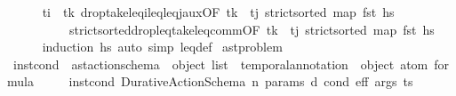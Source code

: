\begin{isabellebody}
%
\isadelimproof
\ \ \ \ %
\endisadelimproof
%
\isatagproof
{}\isamarkupfalse%
\ {\isacartoucheopen}t\isactrlsub i\ {\isasymle}\ t\isactrlsub k{\isacartoucheclose}\ drop{\isacharunderscore}{\kern0pt}take{\isacharunderscore}{\kern0pt}leq\isactrlsub i{\isacharunderscore}{\kern0pt}leq{\isacharunderscore}{\kern0pt}leq\isactrlsub j{\isacharunderscore}{\kern0pt}aux{\isacharbrackleft}{\kern0pt}OF\ {\isacartoucheopen}t\isactrlsub k\ {\isasymle}\ t\isactrlsub j{\isacartoucheclose}\ {\isacartoucheopen}strict{\isacharunderscore}{\kern0pt}sorted\ {\isacharparenleft}{\kern0pt}map\ fst\ hs{\isacharparenright}{\kern0pt}{\isacartoucheclose}{\isacharbrackright}{\kern0pt}\isanewline
\ \ \ \ \ \ \ \ \ \ strict{\isacharunderscore}{\kern0pt}sorted{\isacharunderscore}{\kern0pt}drop{\isacharunderscore}{\kern0pt}leq{\isacharunderscore}{\kern0pt}take{\isacharunderscore}{\kern0pt}leq{\isacharunderscore}{\kern0pt}comm{\isacharbrackleft}{\kern0pt}OF\ {\isacartoucheopen}t\isactrlsub k\ {\isasymle}\ t\isactrlsub j{\isacartoucheclose}\ {\isacartoucheopen}strict{\isacharunderscore}{\kern0pt}sorted\ {\isacharparenleft}{\kern0pt}map\ fst\ hs{\isacharparenright}{\kern0pt}{\isacartoucheclose}{\isacharbrackright}{\kern0pt}\isanewline
\ \ \ \ \isamarkupfalse%
\ {\isacharparenleft}{\kern0pt}induction\ hs{\isacharparenright}{\kern0pt}\ {\isacharparenleft}{\kern0pt}auto\ simp{\isacharcolon}{\kern0pt}\ leq{\isacharunderscore}{\kern0pt}def{\isacharparenright}{\kern0pt}%
\endisatagproof
{\isafoldproof}%
%
\isadelimproof
%
\endisadelimproof
%
\isadelimdocument
%
\endisadelimdocument
%
\isatagdocument
%
\isamarkuptrue%
%
\endisatagdocument
{\isafolddocument}%
%
\isadelimdocument
%
\endisadelimdocument
{}\isamarkupfalse%
\ ast{\isacharunderscore}{\kern0pt}problem\ \isanewline
\isanewline
\ \ \isamarkupfalse%
\ inst{\isacharunderscore}{\kern0pt}cond\ {\isacharcolon}{\kern0pt}{\isacharcolon}{\kern0pt}\ {\isachardoublequoteopen}ast{\isacharunderscore}{\kern0pt}action{\isacharunderscore}{\kern0pt}schema\ {\isasymRightarrow}\ object\ list\ {\isasymRightarrow}\ temporal{\isacharunderscore}{\kern0pt}annotation\ {\isasymRightarrow}\ {\isacharparenleft}{\kern0pt}object\ atom{\isacharparenright}{\kern0pt}\ formula{\isachardoublequoteclose}\ \isanewline
\ \ \ \ {\isachardoublequoteopen}inst{\isacharunderscore}{\kern0pt}cond\ {\isacharparenleft}{\kern0pt}Durative{\isacharunderscore}{\kern0pt}Action{\isacharunderscore}{\kern0pt}Schema\ n\ params\ d\ cond\ eff{\isacharparenright}{\kern0pt}\ args\ ts\ {\isacharequal}{\kern0pt}\ \isanewline

\end{isabellebody}
